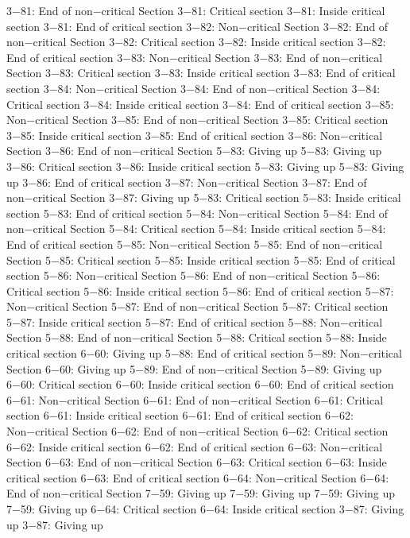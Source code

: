 3−81: End of non−critical Section
3−81: Critical section
3−81: Inside critical section
3−81: End of critical section
3−82: Non−critical Section
3−82: End of non−critical Section
3−82: Critical section
3−82: Inside critical section
3−82: End of critical section
3−83: Non−critical Section
3−83: End of non−critical Section
3−83: Critical section
3−83: Inside critical section
3−83: End of critical section
3−84: Non−critical Section
3−84: End of non−critical Section
3−84: Critical section
3−84: Inside critical section
3−84: End of critical section
3−85: Non−critical Section
3−85: End of non−critical Section
3−85: Critical section
3−85: Inside critical section
3−85: End of critical section
3−86: Non−critical Section
3−86: End of non−critical Section
5−83: Giving up
5−83: Giving up
3−86: Critical section
3−86: Inside critical section
5−83: Giving up
5−83: Giving up
3−86: End of critical section
3−87: Non−critical Section
3−87: End of non−critical Section
3−87: Giving up
5−83: Critical section
5−83: Inside critical section
5−83: End of critical section
5−84: Non−critical Section
5−84: End of non−critical Section
5−84: Critical section
5−84: Inside critical section
5−84: End of critical section
5−85: Non−critical Section
5−85: End of non−critical Section
5−85: Critical section
5−85: Inside critical section
5−85: End of critical section
5−86: Non−critical Section
5−86: End of non−critical Section
5−86: Critical section
5−86: Inside critical section
5−86: End of critical section
5−87: Non−critical Section
5−87: End of non−critical Section
5−87: Critical section
5−87: Inside critical section
5−87: End of critical section
5−88: Non−critical Section
5−88: End of non−critical Section
5−88: Critical section
5−88: Inside critical section
6−60: Giving up
5−88: End of critical section
5−89: Non−critical Section
6−60: Giving up
5−89: End of non−critical Section
5−89: Giving up
6−60: Critical section
6−60: Inside critical section
6−60: End of critical section
6−61: Non−critical Section
6−61: End of non−critical Section
6−61: Critical section
6−61: Inside critical section
6−61: End of critical section
6−62: Non−critical Section
6−62: End of non−critical Section
6−62: Critical section
6−62: Inside critical section
6−62: End of critical section
6−63: Non−critical Section
6−63: End of non−critical Section
6−63: Critical section
6−63: Inside critical section
6−63: End of critical section
6−64: Non−critical Section
6−64: End of non−critical Section
7−59: Giving up
7−59: Giving up
7−59: Giving up
7−59: Giving up
6−64: Critical section
6−64: Inside critical section
3−87: Giving up
3−87: Giving up
